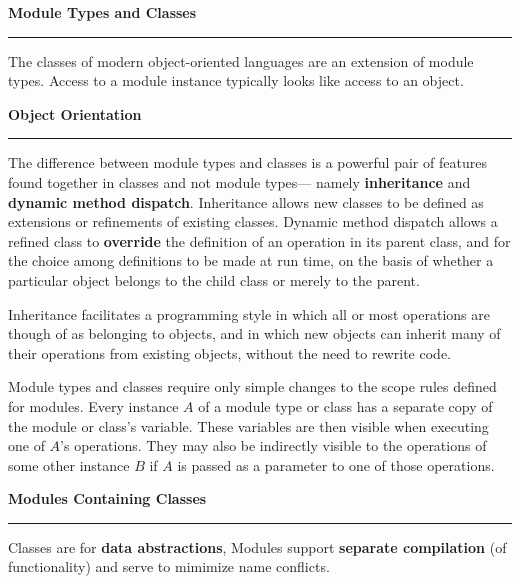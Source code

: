 \nopagenumbers
{\bf Module Types and Classes}
\vskip 1mm
\hrule

\vskip 6pt
The classes of modern object-oriented languages are an extension of module types. Access to a module instance typically looks like access to an object.

\vskip 12pt
{\bf Object Orientation}
\vskip 1mm
\hrule

\vskip 6pt
The difference between module types and classes is a powerful pair of features found together in classes and not module types--- namely {\bf inheritance} and {\bf dynamic method dispatch}. Inheritance allows new classes to be defined as extensions or refinements of existing classes. Dynamic method dispatch allows a refined class to {\bf override} the definition of an operation in its parent class, and for the choice among definitions to be made at run time, on the basis of whether a particular object belongs to the child class or merely to the parent.

\vskip 6pt
Inheritance facilitates a programming style in which all or most operations are though of as belonging to objects, and in which new objects can inherit many of their operations from existing objects, without the need to rewrite code.

\vskip 6pt
Module types and classes require only simple changes to the scope rules defined for modules. Every instance $A$ of a module type or class has a separate copy of the module or class's variable. These variables are then visible when executing one of $A$'s operations. They may also be indirectly visible to the operations of some other instance $B$ if $A$ is passed as a parameter to one of those operations.

\vskip 12pt
{\bf Modules Containing Classes}
\vskip 1mm
\hrule

\vskip 6pt
Classes are for {\bf data abstractions}, Modules support {\bf separate compilation} (of functionality) and serve to mimimize name conflicts.

\vfill\eject
\bye
